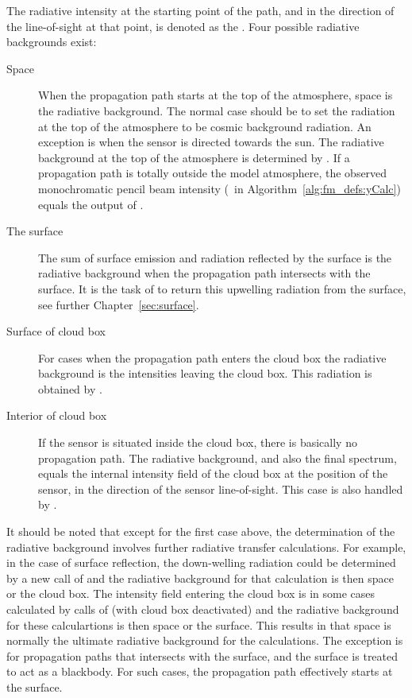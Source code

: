 The radiative intensity at the starting point of the path, and in the
direction of the line-of-sight at that point, is denoted as the
. Four possible radiative backgrounds
exist:
\begin{description}
\item[Space] When the propagation path starts at the top of the
  atmosphere, space is the radiative background. The normal case
  should be to set the radiation at the top of the atmosphere to be
  cosmic background radiation. An exception is when the sensor is
  directed towards the sun. The radiative background at the top of the
  atmosphere is determined by . If a
  propagation path is totally outside the model atmosphere, the
  observed monochromatic pencil beam intensity (\ in
  Algorithm~\ref{alg:fm_defs:yCalc}) equals the output of
  .
\item[The surface] The sum of surface emission and radiation reflected by the
  surface is the radiative background when the propagation path intersects with
  the surface. It is the task of  to return this
  upwelling radiation from the surface, see further
  Chapter~\ref{sec:surface}.
\item[Surface of cloud box] For cases when the propagation path enters
  the cloud box the radiative background is the intensities leaving
  the cloud box. This radiation is obtained by
  . 
\item[Interior of cloud box] If the sensor is situated inside the
  cloud box, there is basically no propagation path. The radiative
  background, and also the final spectrum, equals the internal
  intensity field of the cloud box at the position of the sensor, in
  the direction of the sensor line-of-sight. This case is also handled
  by .
\end{description}
It should be noted that except for the first case above, the determination of
the radiative background involves further radiative transfer calculations. For
example, in the case of surface reflection, the down-welling radiation could be
determined by a new call of  and the radiative
background for that calculation is then space or the cloud box. The intensity
field entering the cloud box is in some cases calculated by calls of
 (with cloud box deactivated) and the radiative
background for these calculartions is then space or the surface. This results
in that space is normally the ultimate radiative background for the
calculations. The exception is for propagation paths that intersects with the
surface, and the surface is treated to act as a blackbody. For such cases, the
propagation path effectively starts at the surface.




